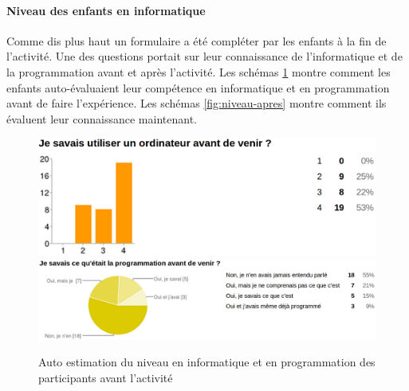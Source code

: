 \paragraph{Niveau des enfants en informatique}
Comme dis plus haut un formulaire a été compléter par les enfants à la fin de l'activité. Une des questions portait sur leur connaissance de l'informatique et de la programmation avant et après l'activité. Les schémas \ref{fig:niveau-avant} montre comment les enfants auto-évaluaient leur compétence en informatique et en programmation avant de faire l'expérience. Les schémas \ref{fig:niveau-apres} montre comment ils évaluent leur connaissance maintenant.
\begin{figure}[ht]
  \begin{center}
    \includegraphics[scale=0.3]{content/8-validation/images/avant}
    \includegraphics[scale=0.2]{content/8-validation/images/programmation}
    \caption{Auto estimation du niveau en informatique et en programmation des participants avant l'activité}
    \label{fig:niveau-avant}
  \end{center}
\end{figure}
